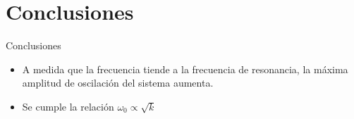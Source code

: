 \section{Conclusiones}\label{sec:conclusiones}

\begin{frame}{Conclusiones}
    \Large{
    \begin{itemize}
        \item A medida que la frecuencia tiende a la frecuencia de resonancia, la máxima amplitud de oscilación del sistema aumenta.
        \item Se cumple la relación $\omega_0 \propto \sqrt{k}$
    \end{itemize}
    }
\end{frame}